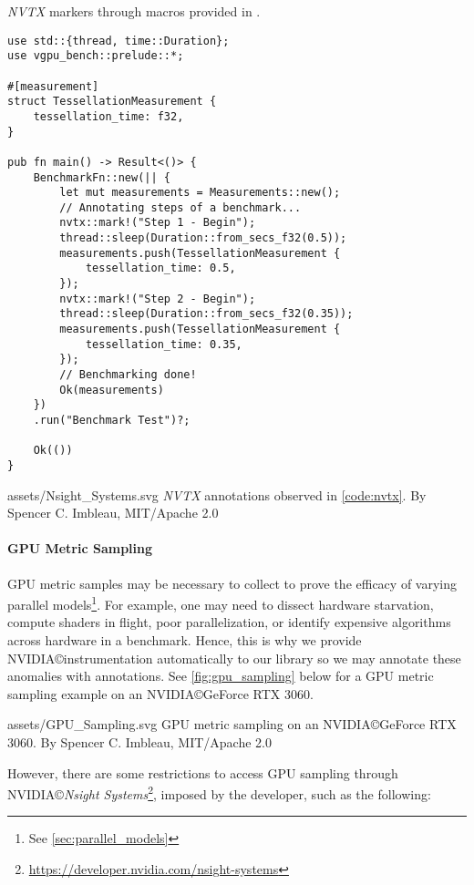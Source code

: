\begin{snippet}
\caption{\textit{NVTX} markers through macros provided in \toollinkedname.}\label{code:nvtx}
\begin{verbatim}
use std::{thread, time::Duration};
use vgpu_bench::prelude::*;

#[measurement]
struct TessellationMeasurement {
    tessellation_time: f32,
}

pub fn main() -> Result<()> {
    BenchmarkFn::new(|| {
        let mut measurements = Measurements::new();
        // Annotating steps of a benchmark...
        nvtx::mark!("Step 1 - Begin");
        thread::sleep(Duration::from_secs_f32(0.5));
        measurements.push(TessellationMeasurement {
            tessellation_time: 0.5,
        });
        nvtx::mark!("Step 2 - Begin");
        thread::sleep(Duration::from_secs_f32(0.35));
        measurements.push(TessellationMeasurement {
            tessellation_time: 0.35,
        });
        // Benchmarking done!
        Ok(measurements)
    })
    .run("Benchmark Test")?;

    Ok(())
}
\end{verbatim}
\end{snippet}

\widesvg
{assets/Nsight_Systems.svg}
{\textit{NVTX} annotations observed in \cref{code:nvtx}.\label{fig:sampling}}
{By Spencer C. Imbleau, MIT/Apache 2.0}
\medskip

\paragraph{GPU Metric Sampling}
GPU metric samples may be necessary to collect to prove the efficacy of varying parallel models\footnote{See \cref{sec:parallel_models}}. For example, one may need to dissect hardware starvation, compute shaders in flight, poor parallelization, or identify expensive algorithms across hardware in a benchmark. Hence, this is why we provide NVIDIA\copyright instrumentation automatically to our library so we may annotate these anomalies with annotations. See \cref{fig:gpu_sampling} below for a GPU metric sampling example on an NVIDIA\copyright GeForce RTX 3060.

\widesvg
{assets/GPU_Sampling.svg}
{GPU metric sampling on an NVIDIA\copyright GeForce RTX 3060.\label{fig:gpu_sampling}}
{By Spencer C. Imbleau, MIT/Apache 2.0}
\medskip

However, there are some restrictions to access GPU sampling through NVIDIA\copyright \textit{Nsight Systems}\footnote{\href{https://developer.nvidia.com/nsight-systems}{https://developer.nvidia.com/nsight-systems}}, imposed by the developer, such as the following:

